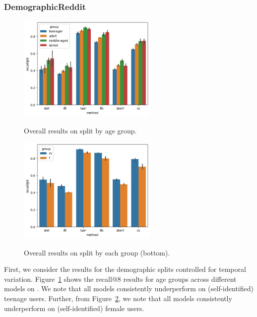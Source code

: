 \subsubsection{DemographicReddit}
\begin{figure}
    \centering
    \includegraphics[width=0.6\textwidth,alt={Barplot showing results for age splits.}]{stylometryExtensions/figures/demo/fixeddelta_demographics_age_groupwise.png}
    \caption{Overall results on \DSagefixed{} split by age group. }
    \label{fig:demographic_fixed:age}
\end{figure}
\begin{figure}
    \centering
    \includegraphics[width=0.6\textwidth,alt={Bar pliot showing gender differences.}]{stylometryExtensions/figures/demo/fixeddelta_demographics_gender_groupwise.png}
    \caption{Overall results on \DSgenderfixed{} split by each group (bottom).}
    \label{fig:demographic_fixed:gender}
\end{figure}
First, we consider the results for the demographic splits controlled for temporal variation.
Figure~\ref{fig:demographic_fixed:age} shows the recall@8 results for age groups across different models on \DSagefixed{}.
We note that all models consistently underperform on (self-identified) teenage users.
Further, from Figure~\ref{fig:demographic_fixed:gender}, we note that all models consistently underperform on (self-identified) female users.

